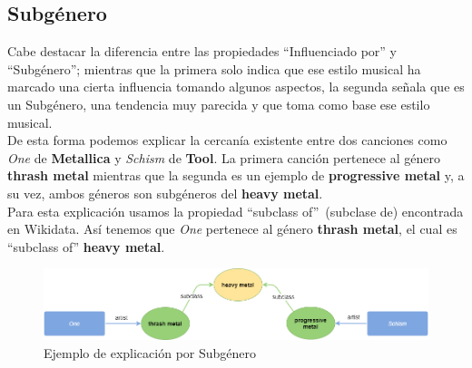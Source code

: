 \subsection{Subgénero}

Cabe destacar la diferencia entre las propiedades ``Influenciado por'' y ``Subgénero''; mientras que la primera solo indica que ese estilo musical ha marcado una cierta influencia tomando algunos aspectos, la segunda señala que es un Subgénero, una tendencia muy parecida y que toma como base ese estilo musical.\\

De esta forma podemos explicar la cercanía existente entre dos canciones como \textit{One} de \textbf{Metallica} y \textit{Schism} de \textbf{Tool}. La primera canción pertenece al género \textbf{thrash metal} mientras que la segunda es un ejemplo de \textbf{progressive metal} y, a su vez, ambos géneros son subgéneros del \textbf{heavy metal}.\\

Para esta explicación usamos la propiedad ``subclass of''~(subclase de) encontrada en Wikidata. Así tenemos que \textit{One} pertenece al género \textbf{thrash metal}, el cual es ``subclass of'' \textbf{heavy metal}.\\

\begin{figure}[h!]
	\centering
	\includegraphics[width = 1\textwidth]{Imagenes/Bitmap/Subgenre.png}
	\caption{Ejemplo de explicación por Subgénero}
	\label{fig:sampleImage}
\end{figure}


